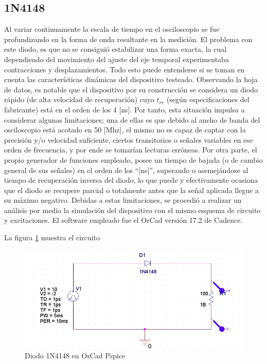 \documentclass{article}
\begin{document}
\subsection{1N4148}
Al variar continuamente la escala de tiempo en el osciloscopio se fue profundizando en la forma de onda resultante en la medición. El problema con este diodo, es que no se consiguió estabilizar una forma exacta, la cual dependiendo del movimiento del ajuste del eje temporal experimentaba contracciones y desplazamientos. Todo esto puede entenderse si se toman en cuenta las características dinámicas del dispositivo testeado. Observando la hoja de datos, es notable que el dispositivo por su construcción se considera un diodo rápido (de alta velocidad de recuperación) cuyo $t_{rr}$ (según especificaciones del fabricante) está en el orden de los 4 [ns]. Por tanto, esta situación impulsa a considerar algunas limitaciones; una de ellas es que debido al ancho de banda del osciloscopio está acotado en 50 [Mhz], el mismo no es capaz de captar con la precisión y/o velocidad suficiente, ciertos transitorios o señales variables en ese orden de frecuencia, y por ende se tomarían lecturas erróneas. Por otra parte, el propio generador de funciones empleado, posee un tiempo de bajada (o de cambio general de sus señales) en el orden de los “[ns]”, superando o asemejándose al tiempo de recuperación inversa del diodo, lo que puede y efectivamente ocasiona que el diodo se recupere parcial o totalmente antes que la señal aplicada llegue a su máximo negativo.
Debidas a estas limitaciones, se procedió a realizar un análisis por medio la simulación del dispositivo con el mismo esquema de circuito y excitaciones. El software empleado fue el OrCad versión 17.2 de Cadence.

La figura \textcolor{blue}{\ref{fig:fig2}} muestra el circuito

\begin{figure}[h]
 \begin{center}
	\includegraphics[scale=0.6]{imagenes/fig2.jpg} 
	\caption{Diodo 1N4148 en OrCad Pspice}\label{fig:fig2}
 \end{center}
\end{figure}
%
\end{document}
